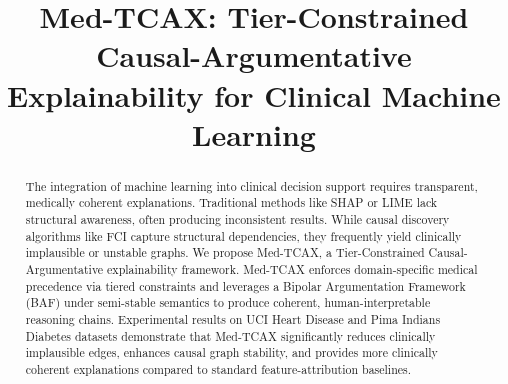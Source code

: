 \documentclass[conference, a4paper]{IEEEtran}
\begin{document}
\title{Med-TCAX: Tier-Constrained Causal-Argumentative Explainability for Clinical Machine Learning}

\author{
\and
{}
\and
{}
\and
{}
}

\maketitle



\begin{abstract}
The integration of machine learning into clinical decision support requires transparent, medically coherent explanations. Traditional methods like SHAP or LIME lack structural awareness, often producing inconsistent results. While causal discovery algorithms like FCI capture structural dependencies, they frequently yield clinically implausible or unstable graphs. We propose Med-TCAX, a Tier-Constrained Causal-Argumentative explainability framework. Med-TCAX enforces domain-specific medical precedence via tiered constraints and leverages a Bipolar Argumentation Framework (BAF) under semi-stable semantics to produce coherent, human-interpretable reasoning chains. Experimental results on UCI Heart Disease and Pima Indians Diabetes datasets demonstrate that Med-TCAX significantly reduces clinically implausible edges, enhances causal graph stability, and provides more clinically coherent explanations compared to standard feature-attribution baselines.
\end{abstract}
\end{document}
